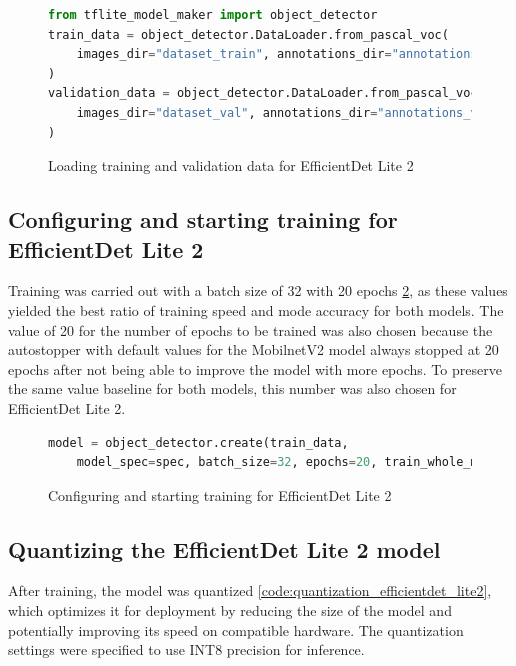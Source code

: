\begin{figure}[H]
\begin{lstlisting}[language=Python]
from tflite_model_maker import object_detector
train_data = object_detector.DataLoader.from_pascal_voc(
    images_dir="dataset_train", annotations_dir="annotations_train", label_map={1:"dislike", 2:"fist", 3:"like", 4:"peace", 5:"stop"}, num_shards=10
)
validation_data = object_detector.DataLoader.from_pascal_voc(
    images_dir="dataset_val", annotations_dir="annotations_val", label_map={1:"dislike", 2:"fist", 3:"like", 4:"peace", 5:"stop"}, num_shards=10
)
\end{lstlisting}
\caption{Loading training and validation data for EfficientDet Lite 2}
\label{code:data_loading_efficientdet_lite2}
\end{figure}

\subsection{Configuring and starting training for EfficientDet Lite 2}
Training was carried out with a batch size of 32 with 20 epochs \ref{code:train_efficientdet_lite2}, as these values yielded the best ratio of training speed and mode accuracy for both models. The value of 20 for the number of epochs to be trained was also chosen because the autostopper with default values for the MobilnetV2 model always stopped at 20 epochs after not being able to improve the model with more epochs. To preserve the same value baseline for both models, this number was also chosen for EfficientDet Lite 2.

\begin{figure}[H]
\begin{lstlisting}[language=Python]
model = object_detector.create(train_data,
    model_spec=spec, batch_size=32, epochs=20, train_whole_model=True, validation_data=validation_data)
\end{lstlisting}
\caption{Configuring and starting training for EfficientDet Lite 2}
\label{code:train_efficientdet_lite2}
\end{figure}

\subsection{Quantizing the EfficientDet Lite 2 model}
After training, the model was quantized \ref{code:quantization_efficientdet_lite2}, which optimizes it for deployment by reducing the size of the model and potentially improving its speed on compatible hardware. The quantization settings were specified to use INT8 precision for inference.

